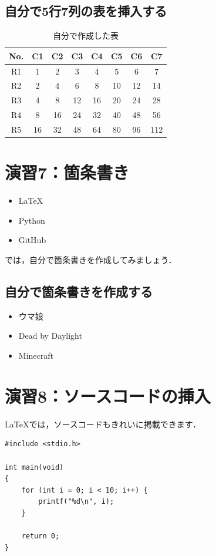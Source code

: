 \documentclass[a4paper,twocolumn]{jsarticle}
\begin{document}
\subsection{自分で5行7列の表を挿入する}
\begin{table}[H]
    \centering
    \begin{tabular}{|c|c|c|c|c|c|c|c|}
      \hline
      No. & C1 & C2 & C3 & C4 & C5 & C6 & C7 \\
      \hline
      R1 & 1 & 2 & 3 & 4 & 5 & 6 & 7 \\
      R2 & 2 & 4 & 6 & 8 & 10 & 12 & 14 \\
      R3 & 4 & 8 & 12 & 16 & 20 & 24 & 28 \\
      R4 & 8 & 16 & 24 & 32 & 40 & 48 & 56 \\
      R5 & 16 & 32 & 48 & 64 & 80 & 96 & 112 \\
      \hline
    \end{tabular}
    \caption{自分で作成した表}
    \label{tab:mypractice}
\end{table}

\section*{演習7：箇条書き}
\begin{itemize}
    \item LaTeX
    \item Python
    \item GitHub
\end{itemize}

では，自分で箇条書きを作成してみましょう．


\subsection{自分で箇条書きを作成する}
\begin{itemize}
    \item ウマ娘
    \item Dead by Daylight
    \item Minecraft
\end{itemize}

\section*{演習8：ソースコードの挿入}
LaTeXでは，ソースコードもきれいに掲載できます．

\begin{lstlisting}
#include <stdio.h>

int main(void)
{
    for (int i = 0; i < 10; i++) {
        printf("%d\n", i);
    }

    return 0;
}
\end{lstlisting}
\end{document}
